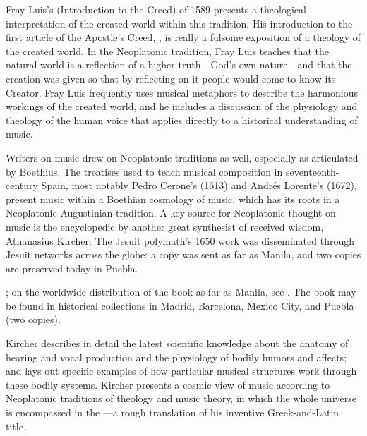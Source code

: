 Fray Luis's  (Introduction to the
Creed) of 1589 presents a theological interpretation of the created world
within this tradition.
His introduction to the first article of the Apostle's Creed, , is really a fulsome
exposition of a theology of the created world.
In the Neoplatonic tradition, Fray Luis teaches that the natural world is a
reflection of a higher truth---God's own nature---and that the creation was
given so that by reflecting on it people would come to know its Creator.
Fray Luis frequently uses musical metaphors to describe the harmonious workings
of the created world, and he includes a discussion of the physiology and
theology of the human voice that applies directly to a historical understanding
of music.

Writers on music drew on Neoplatonic traditions as well, especially as
articulated by Boethius.
The treatises used to teach musical composition in seventeenth-century Spain,
most notably Pedro Cerone's  (1613) and Andrés
Lorente's  (1672), present music within a
Boethian cosmology of music, which has its roots in a Neoplatonic-Augustinian
tradition.
A key source for Neoplatonic thought on music is the encyclopedic
 by another great synthesist of received wisdom,
Athanasius Kircher.%
    \Autocite{Kircher:Musurgia}
The Jesuit polymath's 1650 work was disseminated through Jesuit networks across
the globe: a copy was sent as far as Manila, and two copies are preserved today
in Puebla.%
\begin{Footnote}
    \Autocites{Findlen:Kircher}{Godwin:KircherTheater};
    on the worldwide distribution of the book as far as Manila, see
    \autocite[48--50]{Irving:Colonial}.  
    The book may be found in historical collections in Madrid, Barcelona, Mexico
    City, and Puebla (two copies). %
\end{Footnote}
Kircher describes in detail the latest scientific knowledge about the anatomy
of hearing and vocal production and the physiology of bodily humors and
affects; and lays out specific examples of how particular musical structures
work through these bodily systems.
Kircher presents a cosmic view of music according to Neoplatonic traditions of
theology and music theory, in which the whole universe is encompassed in the
---a rough translation of his inventive
Greek-and-Latin title.%


